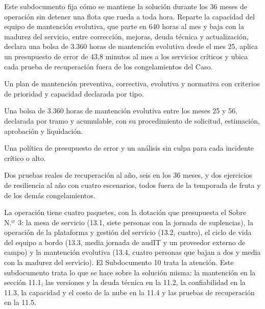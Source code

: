 
\begin{resumenApertura}
Este subdocumento fija cómo se mantiene la solución durante los 36 meses de operación sin detener una
flota que rueda a toda hora. Reparte la capacidad del equipo de mantención evolutiva, que parte en 640
horas al mes y baja con la madurez del servicio, entre corrección, mejoras, deuda técnica y
actualización, declara una bolsa de 3.360 horas de mantención evolutiva desde el mes 25, aplica un presupuesto de error de 43,8 minutos al mes a los servicios críticos y ubica cada
prueba de recuperación fuera de los congelamientos del Caso.
\begin{recibe}
  \item Un plan de mantención preventiva, correctiva, evolutiva y normativa con criterios de prioridad y capacidad declarada por tipo.
  \item Una bolsa de 3.360 horas de mantención evolutiva entre los meses 25 y 56, declarada por tramo y acumulable, con su procedimiento de solicitud, estimación, aprobación y liquidación.
  \item Una política de presupuesto de error y un análisis sin culpa para cada incidente crítico o alto.
  \item Dos pruebas reales de recuperación al año, seis en los 36 meses, y dos ejercicios de resiliencia al año con cuatro escenarios, todos fuera de la temporada de fruta y de los demás congelamientos.
\end{recibe}
\end{resumenApertura}

La operación tiene cuatro paquetes, con la dotación que presupuesta el Sobre N.º~3: la mesa de servicio
(13.1, siete personas con la jornada de suplencias), la operación de la plataforma y gestión del
servicio (13.2, cuatro), el ciclo de vida del equipo a bordo (13.3, media jornada de audIT y un
proveedor externo de campo) y la mantención evolutiva (13.4, cuatro personas que bajan a dos y media
con la madurez del servicio). El Subdocumento 10 trata la
atención. Este subdocumento trata lo que se hace sobre la solución misma: la mantención en la sección
11.1, las versiones y la deuda técnica en la 11.2, la confiabilidad en la 11.3, la capacidad y el costo
de la nube en la 11.4 y las pruebas de recuperación en la 11.5.

